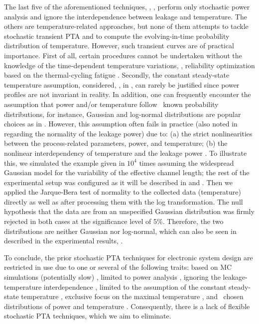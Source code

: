 The last five of the aforementioned techniques, \ie, \cite{shen2009, bhardwaj2006, bhardwaj2008, vrudhula2006, ghanta2006}, perform only stochastic power analysis and ignore the interdependence between leakage and temperature.
The others are temperature-related approaches, but none of them attempts to tackle stochastic transient PTA and to compute the evolving-in-time probability distribution of temperature.
However, such transient curves are of practical importance.
First of all, certain procedures cannot be undertaken without the knowledge of the time-dependent temperature variations, \eg, reliability optimization based on the thermal-cycling fatigue \cite{ukhov2012}.
Secondly, the constant steady-state temperature assumption, considered, \eg, in \cite{juan2011, juan2012}, can rarely be justified since power profiles are not invariant in reality.
In addition, one can frequently encounter the assumption that power and/or temperature follow \apriori\ known probability distributions, for instance, Gaussian and log-normal distributions are popular choices as in \cite{srivastava2010, juan2012, bhardwaj2006}.
However, this assumption often fails in practice (also noted in \cite{juan2012} regarding the normality of the leakage power) due to: (a) the strict nonlinearities between the process-related parameters, power, and temperature; (b) the nonlinear interdependency of temperature and the leakage power \cite{liu2007}.
To illustrate this, we simulated the example given in  $10^4$ times assuming the widespread Gaussian model for the variability of the effective channel length; the rest of the experimental setup was configured as it will be described in  and .
Then we applied the Jarque-Bera test of normality to the collected data (temperature) directly as well as after processing them with the log transformation.
The null hypothesis that the data are from an unspecified Gaussian distribution was firmly rejected in both cases at the significance level of 5\%.
Therefore, the two distributions are neither Gaussian nor log-normal, which can also be seen in  described in the experimental results, .

To conclude, the prior stochastic PTA techniques for electronic system design are restricted in use due to one or several of the following traits: based on MC simulations (potentially slow) \cite{chandra2010}, limited to power analysis \cite{chandra2010, shen2009, bhardwaj2006, bhardwaj2008, vrudhula2006, ghanta2006}, ignoring the leakage-temperature interdependence \cite{shen2009, bhardwaj2006, bhardwaj2008, vrudhula2006, ghanta2006}, limited to the assumption of the constant steady-state temperature \cite{juan2011, juan2012}, exclusive focus on the maximal temperature \cite{juan2011}, and \apriori\ chosen distributions of power and temperature \cite{srivastava2010, juan2012, bhardwaj2006}.
Consequently, there is a lack of flexible stochastic PTA techniques, which we aim to eliminate.
